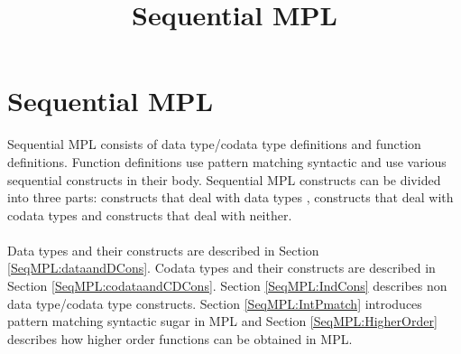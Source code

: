\documentclass[11pt]{article}
\title{Sequential MPL}
\begin{document}
\maketitle
\section {Sequential MPL} 
Sequential MPL consists of data type/codata type definitions and function definitions. Function definitions use pattern matching syntactic and use various sequential constructs in their body. Sequential MPL constructs can be divided into three parts: constructs that deal with data types , constructs that deal with codata types and constructs that deal with neither. 
~~\\~~\\ 
Data types and their constructs are described in Section \ref {SeqMPL:dataandDCons}. Codata types and their constructs are described in Section \ref {SeqMPL:codataandCDCons}. Section \ref {SeqMPL:IndCons} describes non data type/codata type constructs. Section \ref {SeqMPL:IntPmatch} introduces pattern matching syntactic sugar in MPL and Section \ref {SeqMPL:HigherOrder} describes how higher order functions can be obtained in MPL.
\end{document}
